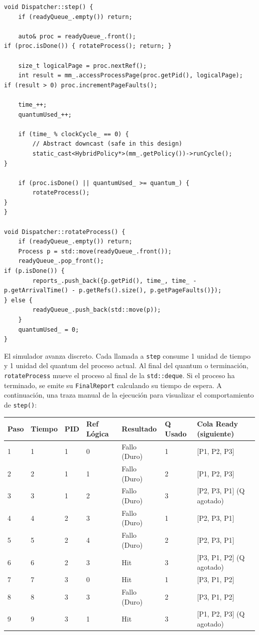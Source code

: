 \documentclass[12pt,letterpaper]{article}
\begin{document}
\begin{tcolorbox}[codebox, title={Dispatcher::step() y rotateProcess()}]
\begin{lstlisting}
void Dispatcher::step() {
    if (readyQueue_.empty()) return;

    auto& proc = readyQueue_.front();
if (proc.isDone()) { rotateProcess(); return; }

    size_t logicalPage = proc.nextRef();
    int result = mm_.accessProcessPage(proc.getPid(), logicalPage);
if (result > 0) proc.incrementPageFaults();

    time_++;
    quantumUsed_++;

    if (time_ % clockCycle_ == 0) {
        // Abstract downcast (safe in this design)
        static_cast<HybridPolicy*>(mm_.getPolicy())->runCycle();
}

    if (proc.isDone() || quantumUsed_ >= quantum_) {
        rotateProcess();
}
}

void Dispatcher::rotateProcess() {
    if (readyQueue_.empty()) return;
    Process p = std::move(readyQueue_.front());
    readyQueue_.pop_front();
if (p.isDone()) {
        reports_.push_back({p.getPid(), time_, time_ - p.getArrivalTime() - p.getRefs().size(), p.getPageFaults()});
} else {
        readyQueue_.push_back(std::move(p));
    }
    quantumUsed_ = 0;
}
\end{lstlisting}
\end{tcolorbox}
El simulador avanza discreto. Cada llamada a \texttt{step} consume 1 unidad de tiempo y 1 unidad del quantum del proceso actual.
Al final del quantum o terminación, \texttt{rotateProcess} mueve el proceso al final de la \texttt{std::deque}.
Si el proceso ha terminado, se emite su \texttt{FinalReport} calculando su tiempo de espera.
A continuación, una traza manual de la ejecución para visualizar el comportamiento de \texttt{step()}:

\begin{longtable}{@{}lllllll@{}}
\toprule
\textbf{Paso} & \textbf{Tiempo} & \textbf{PID} & \textbf{Ref Lógica} & \textbf{Resultado} & \textbf{Q Usado} & \textbf{Cola Ready (siguiente)} \\ \midrule
1 & 1 & 1 & 0 & Fallo (Duro) & 1 & [P1, P2, P3] \\
2 & 2 & 1 & 1 & Fallo (Duro) & 2 & [P1, P2, P3] \\
3 & 3 & 1 & 2 & Fallo (Duro) & 3 & [P2, P3, P1] (Q agotado) \\
4 & 4 & 2 & 3 & Fallo (Duro) & 1 & [P2, P3, P1] \\
5 & 5
& 2 & 4 & Fallo (Duro) & 2 & [P2, P3, P1] \\
6 & 6 & 2 & 3 & Hit & 3 & [P3, P1, P2] (Q agotado) \\
7 & 7 & 3 & 0 & Hit & 1 & [P3, P1, P2] \\
8 & 8 & 3 & 3 & Fallo (Duro) & 2 & [P3, P1, P2] \\
9 & 9 & 3 & 1 & Hit & 3 & [P1, P2, P3] (Q agotado) \\
\bottomrule
\end{longtable}
\end{document}
